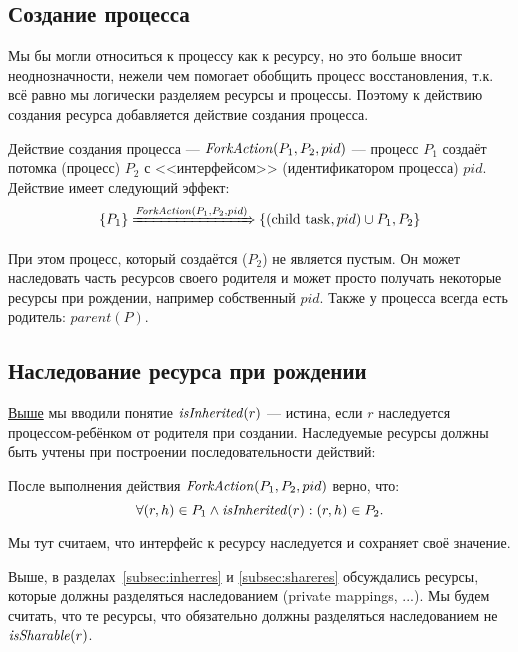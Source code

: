 \subsection{Создание процесса}

Мы бы могли относиться к процессу как к ресурсу, но это больше вносит неоднозначности, нежели чем помогает обобщить процесс восстановления, т.к. всё равно мы логически разделяем ресурсы и процессы. Поэтому к действию создания ресурса добавляется действие создания процесса.

\begin{defn}
\label{def:forkact}
Действие создания процесса --- $\text{\textit{ForkAction}}(P_1, P_2, pid)$ --- процесс $P_1$ создаёт потомка (процесс) $P_2$ с <<интерфейсом>> (идентификатором процесса) $pid$. Действие имеет следующий эффект:
\begin{equation*}
	\left\lbrace P_1 \right\rbrace \xRightarrow{\text{\textit{ForkAction}}(P_1, P_2, pid)} \left\lbrace (\text{child task}, pid) \cup P_1, P_2 \right\rbrace
\end{equation*}
\end{defn}

При этом процесс, который создаётся ($P_2$) не является пустым. Он может наследовать часть ресурсов своего родителя и может просто получать некоторые ресурсы при рождении, например собственный $pid$. Также у процесса всегда есть родитель: $parent(P)$.

\subsection{Наследование ресурса при рождении}

\hyperref[def:isinherited]{Выше} мы вводили понятие $\text{\textit{isInherited}}(r)$ --- истина, если $r$ наследуется процессом-ребёнком от родителя при создании. Наследуемые ресурсы должны быть учтены при построении последовательности действий:

После выполнения действия $\text{\textit{ForkAction}}(P_1, P_2, pid)$ верно, что:
\begin{equation}
\label{eq:inherAtFork} 
	\forall (r, h) \in P_1 \land \text{\textit{isInherited}}(r): (r, h) \in P_2.
\end{equation}

\begin{note}
Мы тут считаем, что интерфейс к ресурсу наследуется и сохраняет своё значение.
\end{note}

Выше, в разделах~\ref{subsec:inherres} и \ref{subsec:shareres} обсуждались ресурсы, которые должны разделяться наследованием (private mappings, ...). Мы будем считать, что те ресурсы, что обязательно должны разделяться наследованием не $\text{\textit{isSharable}}(r)$.

